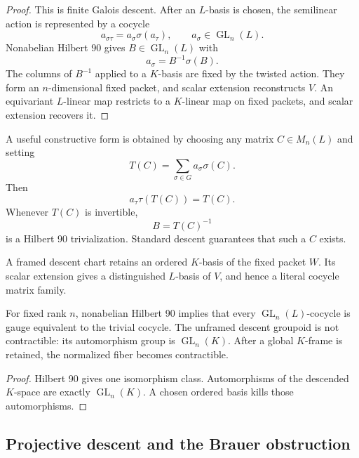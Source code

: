 \begin{proof}
This is finite Galois descent.  After an \(L\)-basis is chosen, the semilinear action is represented by a cocycle
\[
 a_{\sigma\tau}=a_\sigma\sigma(a_\tau),
 \qquad
 a_\sigma\in\operatorname{GL}_n(L).
\]
Nonabelian Hilbert 90 gives \(B\in\operatorname{GL}_n(L)\) with
\[
 a_\sigma=B^{-1}\sigma(B).
\]
The columns of \(B^{-1}\) applied to a \(K\)-basis are fixed by the twisted action.  They form an \(n\)-dimensional fixed packet, and scalar extension reconstructs \(V\).  An equivariant \(L\)-linear map restricts to a \(K\)-linear map on fixed packets, and scalar extension recovers it.
\end{proof}

A useful constructive form is obtained by choosing any matrix \(C\in M_n(L)\) and setting
\[
 T(C)=\sum_{\sigma\in G}a_\sigma\sigma(C).
\]
Then
\[
 a_\tau\tau(T(C))=T(C).
\]
Whenever \(T(C)\) is invertible,
\[
 B=T(C)^{-1}
\]
is a Hilbert 90 trivialization.  Standard descent guarantees that such a \(C\) exists.

\begin{definition}
A framed descent chart retains an ordered \(K\)-basis of the fixed packet \(W\).  Its scalar extension gives a distinguished \(L\)-basis of \(V\), and hence a literal cocycle matrix family.
\end{definition}

\begin{proposition}
\label{prop:block12-framed-unframed}
For fixed rank \(n\), nonabelian Hilbert 90 implies that every \(\operatorname{GL}_n(L)\)-cocycle is gauge equivalent to the trivial cocycle.  The unframed descent groupoid is not contractible: its automorphism group is \(\operatorname{GL}_n(K)\).  After a global \(K\)-frame is retained, the normalized fiber becomes contractible.
\end{proposition}

\begin{proof}
Hilbert 90 gives one isomorphism class.  Automorphisms of the descended \(K\)-space are exactly \(\operatorname{GL}_n(K)\).  A chosen ordered basis kills those automorphisms.
\end{proof}

\subsection{Projective descent and the Brauer obstruction}
\label{subsec:block12-brauer}

